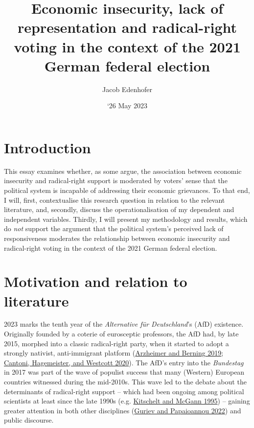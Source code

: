 \documentclass[
]{article}
\title{Economic insecurity, lack of representation and radical-right
voting in the context of the 2021 German federal election}
\author{Jacob Edenhofer}
\date{`26 May 2023}
\begin{document}
\maketitle

\hypertarget{introduction}{%
\section{Introduction}\label{introduction}}

This essay examines whether, as some argue, the association between
economic insecurity and radical-right support is moderated by voters'
sense that the political system is incapable of addressing their
economic grievances. To that end, I will, first, contextualise this
research question in relation to the relevant literature, and, secondly,
discuss the operationalisation of my dependent and independent
variables. Thirdly, I will present my methodology and results, which do
\emph{not} support the argument that the political system's perceived
lack of responsiveness moderates the relationship between economic
insecurity and radical-right voting in the context of the 2021 German
federal election.

\hypertarget{motivation}{%
\section{Motivation and relation to literature}\label{motivation}}

2023 marks the tenth year of the \emph{Alternative für Deutschland}'s
(AfD) existence. Originally founded by a coterie of eurosceptic
professors, the AfD had, by late 2015, morphed into a classic
radical-right party, when it started to adopt a strongly nativist,
anti-immigrant platform
(\protect\hyperlink{ref-arzheimer_how_2019}{Arzheimer and Berning 2019};
\protect\hyperlink{ref-cantoni_persistence_2020}{Cantoni, Hagemeister,
and Westcott 2020}). The AfD's entry into the \emph{Bundestag} in 2017
was part of the wave of populist success that many (Western) European
countries witnessed during the mid-2010s. This wave led to the debate
about the determinants of radical-right support -- which had been
ongoing among political scientists at least since the late 1990s (e.g.
\protect\hyperlink{ref-kitschelt_radical_1995}{Kitschelt and McGann
1995}) -- gaining greater attention in both other disciplines
(\protect\hyperlink{ref-guriev_political_2022}{Guriev and Papaioannou
2022}) and public discourse.
\end{document}
